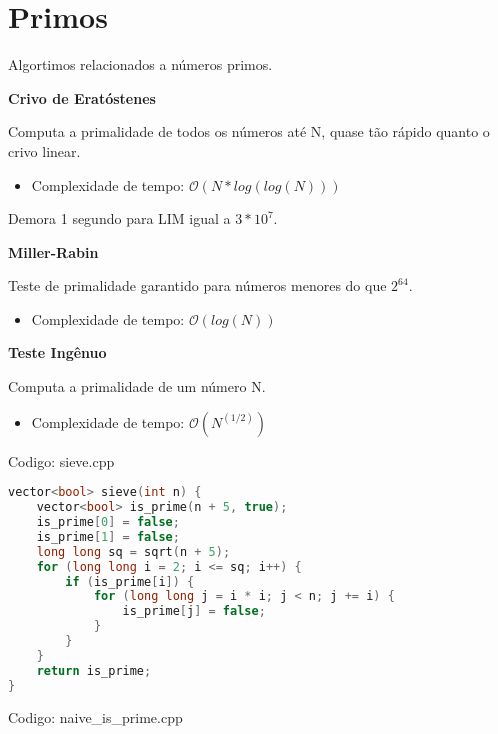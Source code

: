 \documentclass[10pt, a4paper, oneside]{book}
\begin{document}
\section{Primos}


Algortimos relacionados a números primos.



\textbf{Crivo de Eratóstenes} 

Computa a primalidade de todos os números até N, quase tão rápido quanto o crivo linear.



\begin{itemize}
\item Complexidade de tempo: $\mathcal{O}(N * log(log(N)))$
\end{itemize}



Demora 1 segundo para LIM igual a $3 * 10^7$.



\textbf{Miller-Rabin} 

Teste de primalidade garantido para números menores do que $2^64$.



\begin{itemize}
\item Complexidade de tempo: $\mathcal{O}(log(N))$
\end{itemize}



\textbf{Teste Ingênuo} 

Computa a primalidade de um número N.



\begin{itemize}
\item Complexidade de tempo: $\mathcal{O}(N^(1/2))$
\end{itemize}

\hfill

Codigo: sieve.cpp

\begin{lstlisting}[language=C++]
vector<bool> sieve(int n) {
    vector<bool> is_prime(n + 5, true);
    is_prime[0] = false;
    is_prime[1] = false;
    long long sq = sqrt(n + 5);
    for (long long i = 2; i <= sq; i++) {
        if (is_prime[i]) {
            for (long long j = i * i; j < n; j += i) {
                is_prime[j] = false;
            }
        }
    }
    return is_prime;
}
\end{lstlisting}
\hfill

Codigo: naive\_is\_prime.cpp
\end{document}
